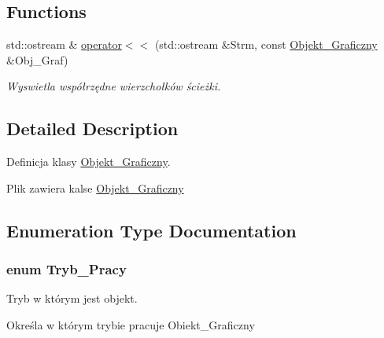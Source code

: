 \subsection*{Functions}
\begin{DoxyCompactItemize}
\item 
\hypertarget{_objekt___graficzny_8hh_a43ce12bd48e47ba41645772340e7103b}{std\+::ostream \& \hyperlink{_objekt___graficzny_8hh_a43ce12bd48e47ba41645772340e7103b}{operator$<$$<$} (std\+::ostream \&Strm, const \hyperlink{class_objekt___graficzny}{Objekt\+\_\+\+Graficzny} \&Obj\+\_\+\+Graf)}\label{_objekt___graficzny_8hh_a43ce12bd48e47ba41645772340e7103b}

\begin{DoxyCompactList}\small\item\em Wyswietla współrzędne wierzchołków ścieżki. \end{DoxyCompactList}\end{DoxyCompactItemize}


\subsection{Detailed Description}
Definicja klasy \hyperlink{class_objekt___graficzny}{Objekt\+\_\+\+Graficzny}. 

Plik zawiera kalse \hyperlink{class_objekt___graficzny}{Objekt\+\_\+\+Graficzny} 

\subsection{Enumeration Type Documentation}
\hypertarget{_objekt___graficzny_8hh_a59b4a471a7481f2a0551d90a8a745c9f}{
\subsubsection[{Tryb\+\_\+\+Pracy}]{\setlength{\rightskip}{0pt plus 5cm}enum {\bf Tryb\+\_\+\+Pracy}}}\label{_objekt___graficzny_8hh_a59b4a471a7481f2a0551d90a8a745c9f}


Tryb w którym jest objekt. 

Określa w którym trybie pracuje Obiekt\+\_\+\+Graficzny 